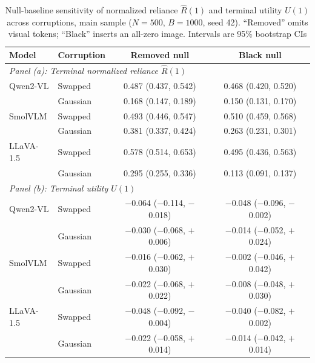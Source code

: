 \documentclass[graybox]{svmult}
\begin{document}
\begin{table}[tb]
\centering
\caption{Null-baseline sensitivity of normalized reliance $\hat{R}(1)$
  and terminal utility $U(1)$ across corruptions, main sample ($N=500$,
  $B=1000$, seed 42). ``Removed'' omits visual tokens; ``Black'' inserts
  an all-zero image. Intervals are 95\% bootstrap CIs}
\label{tab:nullsens}
{\footnotesize\setlength{\tabcolsep}{3pt}%
\begin{tabular}{llcc}
\toprule
\textbf{Model} & \textbf{Corruption} & \textbf{Removed null} & \textbf{Black null} \\
\midrule
\multicolumn{4}{l}{\textit{Panel (a): Terminal normalized reliance $\hat{R}(1)$}} \\
\midrule
Qwen2-VL  & Swapped  & 0.487 (0.437, 0.542) & 0.468 (0.420, 0.520) \\
          & Gaussian & 0.168 (0.147, 0.189) & 0.150 (0.131, 0.170) \\
SmolVLM   & Swapped  & 0.493 (0.446, 0.547) & 0.510 (0.459, 0.568) \\
          & Gaussian & 0.381 (0.337, 0.424) & 0.263 (0.231, 0.301) \\
LLaVA-1.5 & Swapped  & 0.578 (0.514, 0.653) & 0.495 (0.436, 0.563) \\
           & Gaussian & 0.295 (0.255, 0.336) & 0.113 (0.091, 0.137) \\
\midrule
\multicolumn{4}{l}{\textit{Panel (b): Terminal utility $U(1)$}} \\
\midrule
Qwen2-VL  & Swapped  & $-$0.064 ($-$0.114, $-$0.018) & $-$0.048 ($-$0.096, $-$0.002) \\
          & Gaussian & $-$0.030 ($-$0.068, $+$0.006) & $-$0.014 ($-$0.052, $+$0.024) \\
SmolVLM   & Swapped  & $-$0.016 ($-$0.062, $+$0.030) & $-$0.002 ($-$0.046, $+$0.042) \\
          & Gaussian & $-$0.022 ($-$0.068, $+$0.022) & $-$0.008 ($-$0.048, $+$0.030) \\
LLaVA-1.5 & Swapped  & $-$0.048 ($-$0.092, $-$0.004) & $-$0.040 ($-$0.082, $+$0.002) \\
           & Gaussian & $-$0.022 ($-$0.058, $+$0.014) & $-$0.014 ($-$0.042, $+$0.014) \\
\bottomrule
\end{tabular}}
\end{table}

\end{document}
